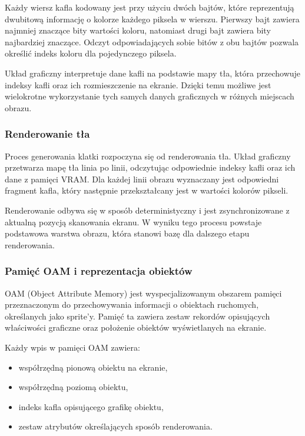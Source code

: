 \documentclass{article}
\begin{document}
Każdy wiersz kafla kodowany jest przy użyciu dwóch bajtów, które reprezentują dwubitową informację o kolorze każdego piksela w wierszu. Pierwszy bajt zawiera najmniej znaczące bity wartości koloru, natomiast drugi bajt zawiera bity najbardziej znaczące. Odczyt odpowiadających sobie bitów z obu bajtów pozwala określić indeks koloru dla pojedynczego piksela.

Układ graficzny interpretuje dane kafli na podstawie mapy tła, która przechowuje indeksy kafli oraz ich rozmieszczenie na ekranie. Dzięki temu możliwe jest wielokrotne wykorzystanie tych samych danych graficznych w różnych miejscach obrazu.

\subsubsection{Renderowanie tła}

Proces generowania klatki rozpoczyna się od renderowania tła. Układ graficzny przetwarza mapę tła linia po linii, odczytując odpowiednie indeksy kafli oraz ich dane z pamięci VRAM. Dla każdej linii obrazu wyznaczany jest odpowiedni fragment kafla, który następnie przekształcany jest w wartości kolorów pikseli.

Renderowanie odbywa się w sposób deterministyczny i jest zsynchronizowane z aktualną pozycją skanowania ekranu. W wyniku tego procesu powstaje podstawowa warstwa obrazu, która stanowi bazę dla dalszego etapu renderowania.

\subsubsection{Pamięć OAM i reprezentacja obiektów}

OAM (Object Attribute Memory) jest wyspecjalizowanym obszarem pamięci przeznaczonym do przechowywania informacji o obiektach ruchomych, określanych jako sprite'y. Pamięć ta zawiera zestaw rekordów opisujących właściwości graficzne oraz położenie obiektów wyświetlanych na ekranie.

Każdy wpis w pamięci OAM zawiera:
\begin{itemize}
	\item współrzędną pionową obiektu na ekranie,
	\item współrzędną poziomą obiektu,
	\item indeks kafla opisującego grafikę obiektu,
	\item zestaw atrybutów określających sposób renderowania.
\end{itemize}
\end{document}
